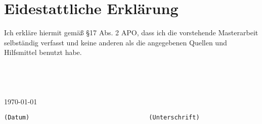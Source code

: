 \chapter*{Eidestattliche Erklärung}
\label{sec:S9_Eid}



Ich erkläre hiermit gemäß §17 Abs. 2 APO, dass ich die vorstehende Masterarbeit selbständig verfasst und keine anderen als die angegebenen Quellen und Hilfsmittel benutzt habe.
\begin{verbatim}




\end{verbatim}
\today
\begin{verbatim}
(Datum)                                 (Unterschrift)
\end{verbatim}